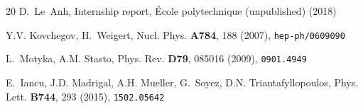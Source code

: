 \documentclass{webofc}
\begin{document}
\begin{thebibliography}{20}
D.~Le~Anh, {Internship report, \'Ecole polytechnique (unpublished)} (2018)

Y.V. Kovchegov, H.~Weigert, Nucl. Phys. \textbf{A784}, 188 (2007),
  \texttt{hep-ph/0609090}

L.~Motyka, A.M. Stasto, Phys. Rev. \textbf{D79}, 085016 (2009),
  \texttt{0901.4949}

E.~Iancu, J.D. Madrigal, A.H. Mueller, G.~Soyez, D.N. Triantafyllopoulos, Phys.
  Lett. \textbf{B744}, 293 (2015), \texttt{1502.05642}

\end{thebibliography}
\end{document}
